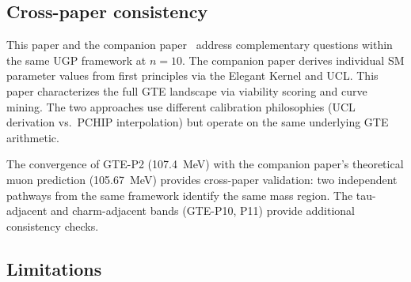 \documentclass[12pt]{article}
\numberwithin{equation}{section}
\begin{document}
\subsection{Cross-paper consistency}

This paper and the companion paper~\cite{SpivackSM} address complementary questions within the same UGP framework at $n{=}10$. The companion paper derives individual SM parameter values from first principles via the Elegant Kernel and UCL. This paper characterizes the full GTE landscape via viability scoring and curve mining. The two approaches use different calibration philosophies (UCL derivation vs.\ PCHIP interpolation) but operate on the same underlying GTE arithmetic.

The convergence of GTE-P2 (107.4~MeV) with the companion paper's theoretical muon prediction (105.67~MeV) provides cross-paper validation: two independent pathways from the same framework identify the same mass region. The tau-adjacent and charm-adjacent bands (GTE-P10, P11) provide additional consistency checks.

\subsection{Limitations}
\end{document}
